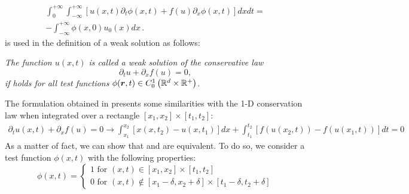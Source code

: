 %
\begin{eqnarray}\label{eq:weak_sol3_sct1b}
\int_0^{+\infty}\int_{-\infty}^{+\infty} \left[ u(x,t) \partial_t \phi(x,t)   + f(u) \partial_x \phi(x,t)  \right] dx dt = \nonumber \\
-\int_{-\infty}^{+\infty} \phi(x,0) u_0(x) dx \,.
\end{eqnarray}
%
 is used in the definition of a weak solution as follows:
%
\begin{definition}
\emph{The function $u(x,t)$ is called a weak solution of the conservative law
%
\begin{equation}
\partial_t u + \partial_x f(u) = 0, \nonumber
\end{equation}
%
if  holds for all test functions $\phi(\boldsymbol r, t) \in C_0^1 \left( \mathbb{R}^d \times \mathbb{R}^+ \right)$.}
\end{definition}
%
The formulation obtained in  presents some similarities with the 1-D conservation law when integrated over a rectangle $\left[ x_1,x_2 \right] \times \left[ t_1,t_2 \right]$:
%
\begin{align}\label{eq:weak_sol4_sct1b}
\partial_t u(x,t) + \partial_x f(u) = 0 \to
\int_{x_1}^{x_2} \left[ x(x,t_2) - u(x,t_1) \right] dx + \int_{t_1}^{t_2} \left[ f(u(x_2,t)) - f(u(x_1,t)) \right]dt = 0
\end{align}
%
As a matter of fact, we can show that  and  are equivalent. To do so, we consider a test function $\phi(x,t)$ with the following properties:
%
\begin{equation}\label{eq:weak_sol5_sct1b}
\phi(x,t) = \left\{
\begin{array}{l}
1  \text{ for }  (x,t) \in \left[ x_1,x_2 \right] \times \left[ t_1,t_2 \right]  \\
0 \text{ for } (x,t) \notin \left[ x_1-\delta,x_2+\delta \right] \times \left[ t_1-\delta,t_2+\delta \right]
\end{array}\right.
\end{equation}
%
